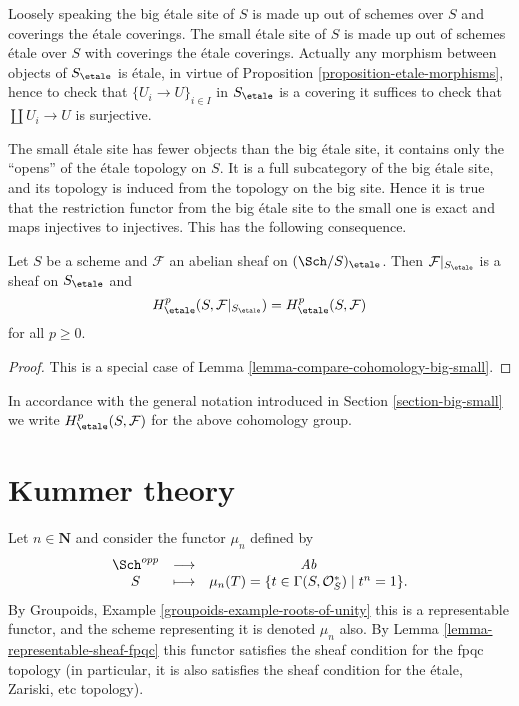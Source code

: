 \noindent
Loosely speaking the big \'etale site of $S$ is made up out of schemes over $S$
and coverings the \'etale coverings. The small \'etale site of $S$ is made up
out of schemes \'etale over $S$ with coverings the \'etale coverings.
Actually any morphism between objects of $S_\etale$ is \'etale, in
virtue of
Proposition \ref{proposition-etale-morphisms},
hence to check that $\{U_i \to U\}_{i \in I}$ in $S_\etale$
is a covering it suffices to check that $\coprod U_i \to U$ is surjective.

\medskip\noindent
The small \'etale site has fewer objects than the big \'etale site, it
contains only the ``opens'' of the \'etale topology on $S$. It is a full
subcategory of the big \'etale site, and its topology is induced from the
topology on the big site. Hence it is true that the restriction functor
from the big \'etale site to the small one is exact and maps injectives to
injectives. This has the following consequence.

\begin{proposition}
\label{proposition-cohomology-restrict-small-site}
Let $S$ be a scheme and $\mathcal{F}$ an abelian sheaf on
$(\Sch/S)_\etale$.
Then $\mathcal{F}|_{S_\etale}$ is a sheaf on $S_\etale$ and
$$
H^p_\etale(S, \mathcal{F}|_{S_\etale}) =
H^p_\etale(S, \mathcal{F})
$$
for all $p \geq 0$.
\end{proposition}

\begin{proof}
This is a special case of Lemma \ref{lemma-compare-cohomology-big-small}.
\end{proof}

\noindent
In accordance with the general notation introduced in
Section \ref{section-big-small}
we write $H_\etale^p(S, \mathcal{F})$ for the above cohomology group.





\section{Kummer theory}
\label{section-kummer}

\noindent
Let $n \in \mathbf{N}$ and consider the functor $\mu_n$ defined by
$$
\begin{matrix}
\Sch^{opp} & \longrightarrow & \textit{Ab} \\
S & \longmapsto &
\mu_n(T)
=
\{t \in \Gamma(S, \mathcal{O}_S^*) \mid t^n = 1 \}.
\end{matrix}
$$
By
Groupoids, Example \ref{groupoids-example-roots-of-unity}
this is a representable functor, and the scheme representing it
is denoted $\mu_n$ also. By
Lemma \ref{lemma-representable-sheaf-fpqc}
this functor satisfies the sheaf condition for the fpqc topology
(in particular, it is also satisfies the sheaf condition for the
\'etale, Zariski, etc topology).

